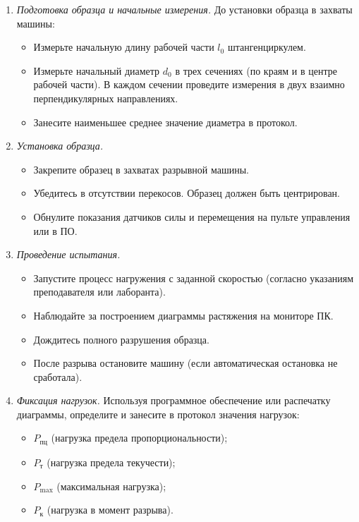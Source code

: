 \begin{enumerate}
    \item \textit{Подготовка образца и начальные измерения.}
    До установки образца в захваты машины:
    \begin{itemize}
        \item Измерьте начальную длину рабочей части $l_0$ штангенциркулем.
        \item Измерьте начальный диаметр $d_0$ в трех сечениях (по краям и в центре рабочей части). В каждом сечении проведите измерения в двух взаимно перпендикулярных направлениях.
        \item Занесите наименьшее среднее значение диаметра в протокол.
    \end{itemize}

    \item \textit{Установка образца.}
    \begin{itemize}
        \item Закрепите образец в захватах разрывной машины.
        \item Убедитесь в отсутствии перекосов. Образец должен быть центрирован.
        \item Обнулите показания датчиков силы и перемещения на пульте управления или в ПО.
    \end{itemize}

    \item \textit{Проведение испытания.}
    \begin{itemize}
        \item Запустите процесс нагружения с заданной скоростью (согласно указаниям преподавателя или лаборанта).
        \item Наблюдайте за построением диаграммы растяжения на мониторе ПК.
        \item Дождитесь полного разрушения образца.
        \item После разрыва остановите машину (если автоматическая остановка не сработала).
    \end{itemize}

    \item \textit{Фиксация нагрузок.}
    Используя программное обеспечение или распечатку диаграммы, определите и занесите в протокол значения нагрузок:
    \begin{itemize}
        \item $P_{\text{пц}}$ (нагрузка предела пропорциональности);
        \item $P_{\text{т}}$ (нагрузка предела текучести);
        \item $P_{\max}$ (максимальная нагрузка);
        \item $P_{\text{к}}$ (нагрузка в момент разрыва).
    \end{itemize}


\end{enumerate}
